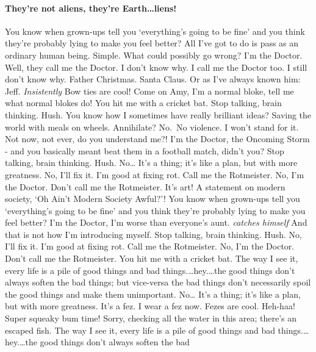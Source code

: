 \hypertarget{theyre-not-aliens-theyre-earthliens}{%
\paragraph{\texorpdfstring{They're not aliens, they're
Earth\ldots{}liens!\newline}{They're not aliens, they're Earth\ldots{}liens!}}\label{theyre-not-aliens-theyre-earthliens}}

You know when grown-ups tell you `everything's going to be fine' and you
think they're probably lying to make you feel better? All I've got to do
is pass as an ordinary human being. Simple. What could possibly go
wrong? I'm the Doctor. Well, they call me the Doctor. I don't know why.
I call me the Doctor too. I still don't know why. Father Christmas.
Santa Claus. Or as I've always known him: Jeff. \emph{Insistently} Bow
ties are cool! Come on Amy, I'm a normal bloke, tell me what normal
blokes do! You hit me with a cricket bat. Stop talking, brain thinking.
Hush. You know how I sometimes have really brilliant ideas? Saving the
world with meals on wheels. Annihilate? No.~No violence. I won't stand
for it. Not now, not ever, do you understand me?! I'm the Doctor, the
Oncoming Storm - and you basically meant beat them in a football match,
didn't you? Stop talking, brain thinking. Hush. No\ldots{} It's a thing;
it's like a plan, but with more greatness. No, I'll fix it. I'm good at
fixing rot. Call me the Rotmeister. No, I'm the Doctor. Don't call me
the Rotmeister. It's art! A statement on modern society, `Oh Ain't
Modern Society Awful?'! You know when grown-ups tell you `everything's
going to be fine' and you think they're probably lying to make you feel
better? I'm the Doctor, I'm worse than everyone's aunt. \emph{catches
himself} And that is not how I'm introducing myself. Stop talking, brain
thinking. Hush. No, I'll fix it. I'm good at fixing rot. Call me the
Rotmeister. No, I'm the Doctor. Don't call me the Rotmeister. You hit me
with a cricket bat. The way I see it, every life is a pile of good
things and bad things.\ldots{}hey.\ldots{}the good things don't always
soften the bad things; but vice-versa the bad things don't necessarily
spoil the good things and make them unimportant. No\ldots{} It's a
thing; it's like a plan, but with more greatness. It's a fez. I wear a
fez now. Fezes are cool. Heh-haa! Super squeaky bum time! Sorry,
checking all the water in this area; there's an escaped fish. The way I
see it, every life is a pile of good things and bad
things.\ldots{}hey.\ldots{}the good things don't always soften the bad
